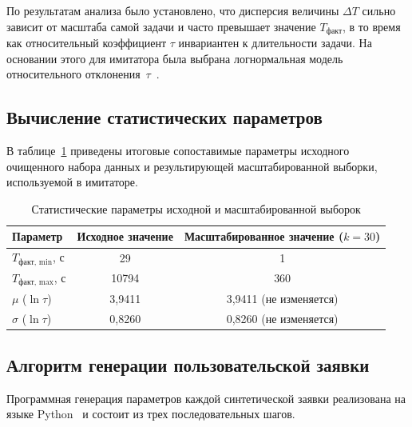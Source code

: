 По результатам анализа было установлено, что дисперсия величины $\Delta T$ сильно зависит от масштаба самой задачи и часто превышает значение $T_{\text{факт}}$, в то время как относительный коэффициент $\tau$ инвариантен к длительности задачи. На основании этого для имитатора была выбрана логнормальная модель относительного отклонения~$\tau$~\cite{mualem2001utilization,tsafrir2007backfilling}.

\subsection*{Вычисление статистических параметров}
В таблице~\ref{tab:stats_comparison} приведены итоговые сопоставимые параметры исходного очищенного набора данных и результирующей масштабированной выборки, используемой в имитаторе.

\begin{table}[H]
\caption{Статистические параметры исходной и масштабированной выборок}
\label{tab:stats_comparison}
\centering
\begin{tabular}{|l|c|c|}
\hline
Параметр & Исходное значение & Масштабированное значение ($k=30$) \\
\hline
$T_{\text{факт, min}}$, с & 29     & 1   \\
$T_{\text{факт, max}}$, с & 10794  & 360 \\
$\mu$ ($\ln \tau$)        & 3,9411 & 3,9411 (не изменяется) \\
$\sigma$ ($\ln \tau$)     & 0,8260 & 0,8260 (не изменяется) \\
\hline
\end{tabular}
\end{table}

\subsection*{Алгоритм генерации пользовательской заявки}
Программная генерация параметров каждой синтетической заявки реализована на языке Python~\cite{python3docs} и состоит из трех последовательных шагов.

